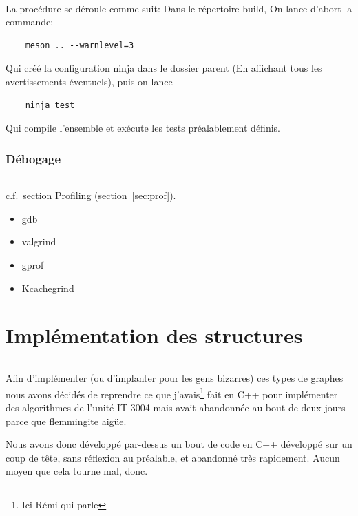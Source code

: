 \documentclass[french]{article}
\begin{document}
\paragraph{} La procédure se déroule comme suit: Dans le répertoire build, On
lance d'abort la commande:

\begin{verbatim}
	meson .. --warnlevel=3
\end{verbatim}

Qui créé la configuration ninja dans le dossier parent (En affichant tous les
avertissements éventuels), puis on lance

\begin{verbatim}
	ninja test
\end{verbatim}

Qui compile l'ensemble et exécute les tests préalablement définis.

\section{Débogage}

\paragraph{} c.f.\ section Profiling (section~\ref{sec:prof}).

\begin{itemize}
	\item gdb
	\item valgrind
	\item gprof
	\item Kcachegrind
\end{itemize}

\part{Implémentation des structures}

\paragraph{} Afin d'implémenter (ou d'implanter pour les gens bizarres) ces
types de graphes nous avons décidés de reprendre ce que j'avais\footnote{Ici
	Rémi qui parle} fait en C++ pour implémenter des algorithmes de l'unité
IT-3004 mais avait abandonnée au bout de deux jours parce que flemmingite
aigüe.

Nous avons donc développé par-dessus un bout de code en C++ développé sur un
coup de tête, sans réflexion au préalable, et abandonné très rapidement. Aucun
moyen que cela tourne mal, donc.
\end{document}
